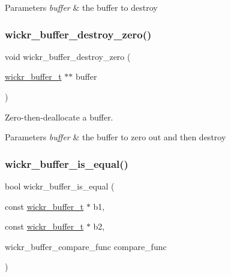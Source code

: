 \begin{DoxyParams}{Parameters}
{\em buffer} & the buffer to destroy \\
\hline
\end{DoxyParams}
\mbox{\label{group__wickr__buffer_gaf0ff6486debbfd676b7675f6f899fc40}} 
\subsubsection{\texorpdfstring{wickr\_buffer\_destroy\_zero()}{wickr\_buffer\_destroy\_zero()}}
{\footnotesize\ttfamily void wickr\+\_\+buffer\+\_\+destroy\+\_\+zero (\begin{DoxyParamCaption}\item[{\mbox{\hyperlink{structwickr__buffer}{wickr\+\_\+buffer\+\_\+t}} $\ast$$\ast$}]{buffer }\end{DoxyParamCaption})}



Zero-\/then-\/deallocate a buffer. 


\begin{DoxyParams}{Parameters}
{\em buffer} & the buffer to zero out and then destroy \\
\hline
\end{DoxyParams}
\mbox{\label{group__wickr__buffer_ga51ec58848ab0b07d164c6f7d73200c24}} 
\subsubsection{\texorpdfstring{wickr\_buffer\_is\_equal()}{wickr\_buffer\_is\_equal()}}
{\footnotesize\ttfamily bool wickr\+\_\+buffer\+\_\+is\+\_\+equal (\begin{DoxyParamCaption}\item[{const \mbox{\hyperlink{structwickr__buffer}{wickr\+\_\+buffer\+\_\+t}} $\ast$}]{b1,  }\item[{const \mbox{\hyperlink{structwickr__buffer}{wickr\+\_\+buffer\+\_\+t}} $\ast$}]{b2,  }\item[{wickr\+\_\+buffer\+\_\+compare\+\_\+func}]{compare\+\_\+func }\end{DoxyParamCaption})}



